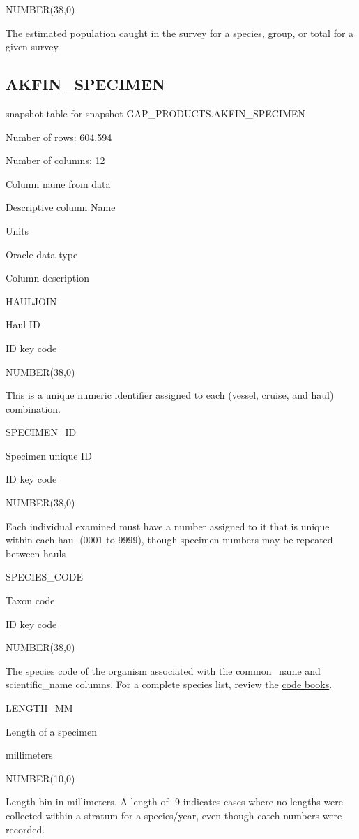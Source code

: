 \documentclass[
  letterpaper,
  oneside,
  open=any]{scrbook}
\begin{document}
NUMBER(38,0)

The estimated population caught in the survey for a species, group, or
total for a given survey.

\subsection{AKFIN\_SPECIMEN}\label{akfin_specimen}

snapshot table for snapshot GAP\_PRODUCTS.AKFIN\_SPECIMEN

Number of rows: 604,594

Number of columns: 12

Column name from data

Descriptive column Name

Units

Oracle data type

Column description

HAULJOIN

Haul ID

ID key code

NUMBER(38,0)

This is a unique numeric identifier assigned to each (vessel, cruise,
and haul) combination.

SPECIMEN\_ID

Specimen unique ID

ID key code

NUMBER(38,0)

Each individual examined must have a number assigned to it that is
unique within each haul (0001 to 9999), though specimen numbers may be
repeated between hauls

SPECIES\_CODE

Taxon code

ID key code

NUMBER(38,0)

The species code of the organism associated with the common\_name and
scientific\_name columns. For a complete species list, review the
\href{https://www.fisheries.noaa.gov/resource/document/groundfish-survey-species-code-manual-and-data-codes-manual}{code
books}.

LENGTH\_MM

Length of a specimen

millimeters

NUMBER(10,0)

Length bin in millimeters. A length of -9 indicates cases where no
lengths were collected within a stratum for a species/year, even though
catch numbers were recorded.
\end{document}
